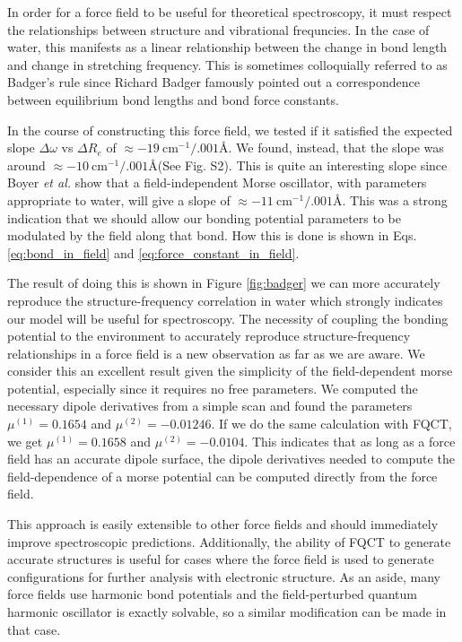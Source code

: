 \documentclass[journal=jctcce,manuscript=article]{achemso}
\begin{document}
In order for a force field to be useful for theoretical spectroscopy, it must respect the relationships between structure and vibrational frequncies. In the case of water, this manifests as a linear relationship between the change in bond length and change in  stretching frequency.\cite{boyer2019beyond} This is sometimes colloquially referred to as Badger's rule since Richard Badger famously pointed out a correspondence between equilibrium bond lengths and bond force constants.\cite{badger1934relation}

In the course of constructing this force field, we tested if it satisfied the expected slope $\Delta\omega$ vs $\Delta R_e$ of $\approx -19\ \mathrm{cm^{-1}/.001}$\AA\cite{boyer2019beyond}. We found, instead, that the slope was around $\approx -10\ \mathrm{cm^{-1}/.001}$\AA (See Fig. S2). This is quite an interesting slope since Boyer \textit{et al.} show that a field-independent Morse oscillator, with parameters appropriate to water, will give a slope of $\approx -11\ \mathrm{cm^{-1}/.001}$\AA. This was a strong indication that we should allow our bonding potential parameters to be modulated by the field along that bond. How this is done is shown in Eqs. \ref{eq:bond_in_field} and \ref{eq:force_constant_in_field}.

The result of doing this is shown in Figure \ref{fig:badger} we can more accurately reproduce the structure-frequency correlation in water which strongly indicates our model will be useful for spectroscopy. The necessity of coupling the bonding potential to the environment to accurately reproduce structure-frequency relationships in a force field is a new observation as far as we are aware. We consider this an excellent result given the simplicity of the field-dependent morse potential, especially since it requires no free parameters. We computed the necessary dipole derivatives from a simple  scan and found the parameters $\mu^{(1)}=0.1654$ and $\mu^{(2)}=-0.01246$. If we do the same calculation with FQCT, we get $\mu^{(1)}=0.1658$ and $\mu^{(2)}=-0.0104$. This indicates that as long as a force field has an accurate dipole surface, the dipole derivatives needed to compute the field-dependence of a morse potential can be computed directly from the force field.

This approach is easily extensible to other force fields and should immediately improve spectroscopic predictions. Additionally, the ability of FQCT to generate accurate structures is useful for cases where the force field is used to generate configurations for further analysis with electronic structure. As an aside, many force fields use harmonic bond potentials and the field-perturbed quantum harmonic oscillator is exactly solvable, so a similar modification can be made in that case.
\end{document}
